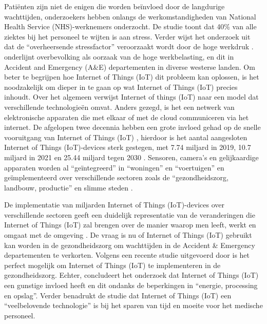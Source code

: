 Patiënten zijn niet de enigen die worden beïnvloed door de langdurige wachttijden, onderzoekers hebben onlangs de werkomstandigheden van National Health Service (NHS)-werknemers onderzocht. De studie toont dat 40\% van alle ziektes bij het personeel te wijten is aan stress. Verder wijst het onderzoek uit dat de “overheersende stressfactor” veroorzaakt wordt door de hoge werkdruk \autocite{Ravalier2020}. \autocite{Vainieri2020} onderlijnt overbevolking als oorzaak van de hoge werkbelasting, en dit in Accident and Emergency (A\&E) departementen in diverse westerse landen. Om beter te begrijpen hoe Internet of Things (IoT) dit probleem kan oplossen, is het noodzakelijk om dieper in te gaan op wat Internet of Things (IoT) precies inhoudt. Over het algemeen verwijst Internet of things (IoT) naar een model dat verschillende technologieën omvat. Anders gezegd, is het een netwerk van elektronische apparaten die met elkaar of met de cloud communiceren via het internet. De afgelopen twee decennia hebben een grote invloed gehad op de snelle vooruitgang van Internet of Things (IoT) \autocite{Almutairi2024}, hierdoor is het aantal aangesloten Internet of Things (IoT)-devices sterk gestegen, met 7.74 miljard in 2019, 10.7 miljard in 2021 \autocite{Dawod2022} en 25.44 miljard tegen 2030 \autocite{Dawod2022}. Sensoren, camera's en gelijkaardige apparaten worden al “geïntegreerd” in “woningen” en “voertuigen” \autocite{Dawod2022} en geïmplementeerd over verschillende sectoren zoals de “gezondheidszorg, landbouw, productie” en slimme steden \autocite{Almutairi2024}.

De implementatie van miljarden \autocite{Dawod2022} Internet of Things (IoT)-devices over verschillende sectoren geeft een duidelijk representatie van de veranderingen die Internet of Things (IoT) zal brengen over de manier waarop men leeft, werkt en omgaat met de omgeving \autocite{Almutairi2024}. De vraag is nu of Internet of Things (IoT) gebruikt kan worden in de gezondheidszorg om wachttijden in de Accident \& Emergency departementen te verkorten. Volgens een recente studie uitgevoerd door \autocite{Singh2023} is het perfect mogelijk om Internet of Things (IoT) te implementeren in de gezondheidszorg. Echter, concludeert het onderzoek dat Internet of Things (IoT) een gunstige invloed heeft en dit ondanks de beperkingen in “energie, processing en opslag”. Verder benadrukt de studie dat Internet of Things (IoT) een “veelbelovende technologie” is bij het sparen van tijd en moeite voor het medische personeel. 


